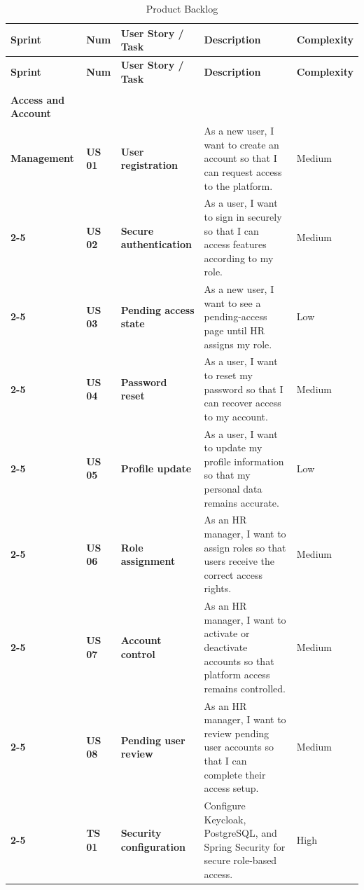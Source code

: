 \begin{longtable}{|>{\centering\bfseries}m{2.55cm}|>{\centering\bfseries}m{0.9cm}|>{\centering\bfseries}m{3.05cm}|m{6.75cm}|>{\centering\arraybackslash}m{1.45cm}|}
\caption{Product Backlog}\label{tab:product_backlog}\\
\hline
\rowcolor{blue!20}
\textbf{Sprint} & \textbf{Num} & \textbf{User Story / Task} & \centering\textbf{Description} & {\scriptsize\textbf{Complexity}} \\
\hline
\endfirsthead
\hline
\rowcolor{blue!20}
\textbf{Sprint} & \textbf{Num} & \textbf{User Story / Task} & \centering\textbf{Description} & {\scriptsize\textbf{Complexity}} \\
\hline
\endhead
\hline
\endfoot
\endlastfoot

\multirow{10}{=}{\centering\textbf{Sprint 1\\[4pt] Access and Account\\Management}}
& US 01 & User registration & As a new user, I want to create an account so that I can request access to the platform. & Medium \\
\cline{2-5}
& US 02 & Secure authentication & As a user, I want to sign in securely so that I can access features according to my role. & Medium \\
\cline{2-5}
& US 03 & Pending access state & As a new user, I want to see a pending-access page until HR assigns my role. & Low \\
\cline{2-5}
& US 04 & Password reset & As a user, I want to reset my password so that I can recover access to my account. & Medium \\
\cline{2-5}
& US 05 & Profile update & As a user, I want to update my profile information so that my personal data remains accurate. & Low \\
\cline{2-5}
& US 06 & Role assignment & As an HR manager, I want to assign roles so that users receive the correct access rights. & Medium \\
\cline{2-5}
& US 07 & Account control & As an HR manager, I want to activate or deactivate accounts so that platform access remains controlled. & Medium \\
\cline{2-5}
& US 08 & Pending user review & As an HR manager, I want to review pending user accounts so that I can complete their access setup. & Medium \\
\cline{2-5}
& TS 01 & Security configuration & Configure Keycloak, PostgreSQL, and Spring Security for secure role-based access. & High \\

\end{longtable}
